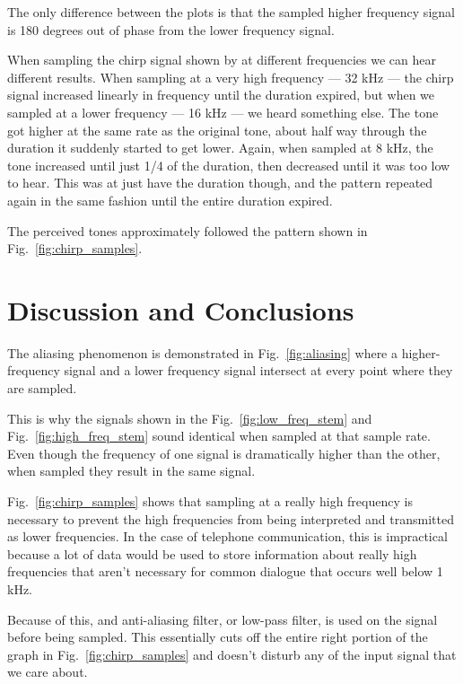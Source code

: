 \documentclass[11pt]{texMemo-gibbons}
\begin{document}
The only difference between the plots is that the sampled
higher frequency signal is 180 degrees out of phase
from the lower frequency signal.

When sampling the chirp signal shown by at different frequencies
we can hear different results. When sampling at a very
high frequency --- 32 kHz --- the chirp signal increased
linearly in frequency until the duration expired, but
when we sampled at a lower frequency --- 16 kHz ---
we heard something else. The tone got higher at the
same rate as the original tone, about half way through
the duration it suddenly started to get lower. Again,
when sampled at 8 kHz, the tone increased until just
1/4 of the duration, then decreased until it was too
low to hear. This was at just have the duration though,
and the pattern repeated again in the same fashion until
the entire duration expired.

The perceived tones approximately followed the pattern
shown in Fig.~\ref{fig:chirp_samples}.

\section{Discussion and Conclusions}
\label{sec:conclusions}

The aliasing phenomenon is demonstrated in Fig.~\ref{fig:aliasing}
where a higher-frequency signal and a lower frequency
signal intersect at every point where they are sampled.

This is why the signals shown in the Fig.~\ref{fig:low_freq_stem}
and Fig.~\ref{fig:high_freq_stem} sound identical when
sampled at that sample rate. Even though the frequency
of one signal is dramatically higher than the other,
when sampled they result in the same signal.

Fig.~\ref{fig:chirp_samples} shows that sampling at
a really high frequency is necessary to prevent the
high frequencies from being interpreted and transmitted
as lower frequencies. In the case of telephone communication,
this is impractical because a lot of data would be used
to store information about really high frequencies that
aren't necessary for common dialogue that occurs well below
1 kHz.

Because of this, and anti-aliasing filter, or low-pass
filter, is used on the signal before being sampled.
This essentially cuts off the entire right portion of
the graph in Fig.~\ref{fig:chirp_samples} and doesn't
disturb any of the input signal that we care about.
\end{document}

